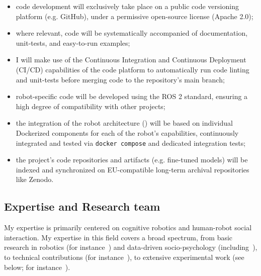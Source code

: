 \begin{itemize}
    \item code development will exclusively take place on a public code versioning
        platform (e.g. GitHub), under a permissive open-source license (Apache
        2.0);
    \item where relevant, code will be systematically accompanied of
        documentation, unit-tests, and easy-to-run examples;
    \item I will make use of the Continuous Integration and Continuous
        Deployment (CI/CD) capabilities of the code platform to automatically
        run code linting and unit-tests before merging code to the repository's
        main branch;
    \item robot-specific code will be developed using the ROS 2 standard,
        ensuring a high degree of compatibility with other projects;
    \item the integration of the robot architecture (\tCC) will be based on individual Dockerized
        components for each of the robot's capabilities, continuously integrated
        and tested via \texttt{docker compose} and dedicated integration tests;
    \item the project's code repositories and artifacts (e.g. fine-tuned models)
        will be indexed and synchronized on EU-compatible long-term archival
        repositories like Zenodo.  
\end{itemize}

\subsection{Expertise and Research team}
\label{research-team}

My expertise is primarily centered on cognitive robotics and human-robot social
interaction. My expertise in this field covers a broad spectrum, from basic
research in robotics (for
instance~\cite{lemaignan2014dynamics,lemaignan2015mutual}) and data-driven
socio-psychology
(including~\cite{lemaignan2014cognitive,irfan2018social,winkle2019effective,bartlett2019what}),
to technical contributions (for instance~\cite{lemaignan2010oro,
lemaignan2017artificial, lemaignan2018underworlds}), to extensive experimental
work (see below; for instance~\cite{hood2015cowriter,winkle2020couch,
lemaignan2022social}).

